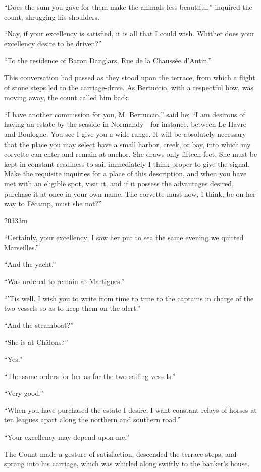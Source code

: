 “Does the sum you gave for them make the animals less beautiful,”
inquired the count, shrugging his shoulders.

“Nay, if your excellency is satisfied, it is all that I could wish.
Whither does your excellency desire to be driven?”

“To the residence of Baron Danglars, Rue de la Chaussée d’Antin.”

This conversation had passed as they stood upon the terrace, from which
a flight of stone steps led to the carriage-drive. As Bertuccio, with a
respectful bow, was moving away, the count called him back.

“I have another commission for you, M. Bertuccio,” said he; “I am
desirous of having an estate by the seaside in Normandy—for instance,
between Le Havre and Boulogne. You see I give you a wide range. It will
be absolutely necessary that the place you may select have a small
harbor, creek, or bay, into which my corvette can enter and remain at
anchor. She draws only fifteen feet. She must be kept in constant
readiness to sail immediately I think proper to give the signal. Make
the requisite inquiries for a place of this description, and when you
have met with an eligible spot, visit it, and if it possess the
advantages desired, purchase it at once in your own name. The corvette
must now, I think, be on her way to Fécamp, must she not?”

20333m



“Certainly, your excellency; I saw her put to sea the same evening we
quitted Marseilles.”

“And the yacht.”

“Was ordered to remain at Martigues.”

“’Tis well. I wish you to write from time to time to the captains in
charge of the two vessels so as to keep them on the alert.”

“And the steamboat?”

“She is at Châlons?”

“Yes.”

“The same orders for her as for the two sailing vessels.”

“Very good.”

“When you have purchased the estate I desire, I want constant relays of
horses at ten leagues apart along the northern and southern road.”

“Your excellency may depend upon me.”

The Count made a gesture of satisfaction, descended the terrace steps,
and sprang into his carriage, which was whirled along swiftly to the
banker’s house.

